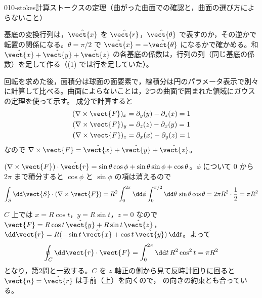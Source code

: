 \documentclass[uplatex,dvipdfmx,a4paper,11pt]{jsarticle}
\begin{document}
\begin{mondai}{010-stokes}{計算}{ストークスの定理（曲がった曲面での確認と，曲面の選び方によらないこと）}
\begin{kizuki}
\item 基底の変換行列は，$\hat{\vect{x}}$ を $\hat{\vect{r}}$，$\hat{\vect{\theta}}$ で表すのか，その逆かで転置の関係になる。$\theta=\pi/2$ で $\hat{\vect{x}}=-\hat{\vect{\theta}}$ になるかで確かめる。和 $\hat{\vect{x}}+\hat{\vect{y}}+\hat{\vect{z}}$ の各基底の係数は，行列の列（同じ基底の係数）を足して作る（(1) では行を足していた）。
\end{kizuki}
\begin{tadashii}
\houshin 回転を求めた後，面積分は球面の面要素で，線積分は円のパラメータ表示で別々に計算して比べる。曲面によらないことは，2つの曲面で囲まれた領域にガウスの定理を使って示す。
\keisan {} 成分で計算すると
\begin{align*}
  (\nabla\times\vect{F})_x &= \partial_y(y) - \partial_z(x) = 1 \\
  (\nabla\times\vect{F})_y &= \partial_z(z) - \partial_x(y) = 1 \\
  (\nabla\times\vect{F})_z &= \partial_x(x) - \partial_y(z) = 1
\end{align*}
なので $\nabla\times\vect{F} = \hat{\vect{x}} + \hat{\vect{y}} + \hat{\vect{z}}$。

 $(\nabla\times\vect{F})\cdot\hat{\vect{r}} = \sin\theta\cos\phi + \sin\theta\sin\phi + \cos\theta$。$\phi$ について $0$ から $2\pi$ まで積分すると $\cos\phi$ と $\sin\phi$ の項は消えるので
\[ \int_S\dd\vect{S}\cdot(\nabla\times\vect{F}) = R^2\int_0^{2\pi}\dd\phi\int_0^{\pi/2}\dd\theta\,\sin\theta\cos\theta = 2\pi R^2\cdot\frac{1}{2} = \pi R^2 \]

 $C$ 上では $x = R\cos t$，$y = R\sin t$，$z = 0$ なので $\vect{F} = R\cos t\,\hat{\vect{y}} + R\sin t\,\hat{\vect{z}}$，$\dd\vect{r} = R(-\sin t\,\hat{\vect{x}} + \cos t\,\hat{\vect{y}})\,\dd t$。よって
\[ \oint_C\dd\vect{r}\cdot\vect{F} = \int_0^{2\pi}\dd t\,R^2\cos^2t = \pi R^2 \]
となり，第2問と一致する。$C$ を $z$ 軸正の側から見て反時計回りに回ると $\hat{\vect{n}} = \hat{\vect{r}}$ は手前（上）を向くので， の向きの約束とも合っている。


\end{tadashii}
\end{mondai}
\end{document}
